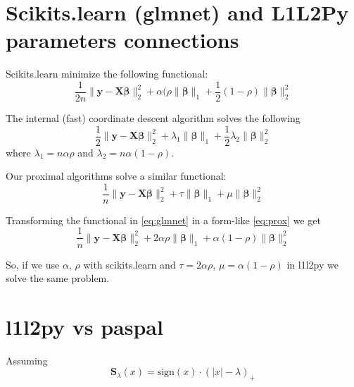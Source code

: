 \documentclass[a4paper,10pt]{article}
\title{}
\author{}
\newcommand{\bbeta}{\boldsymbol{\beta}}
\newcommand{\X}{\mathbf{X}}
\newcommand{\y}{\mathbf{y}}
\begin{document}
\maketitle

\begin{abstract}

\end{abstract}

\section{Scikits.learn (glmnet) and L1L2Py parameters connections}
Scikits.learn minimize the following functional:
\begin{equation} \label{eq:glmnet}
  \frac{1}{2n} \| \y - \X \bbeta \|_2^2 
      + \alpha( \rho \| \bbeta \|_1 + \frac{1}{2}(1 - \rho) \| \bbeta \|_2^2
\end{equation}

\noindent
The internal (fast) coordinate descent algorithm solves the following
\begin{equation}
  \frac{1}{2} \| \y - \X \bbeta \|_2^2 
      + \lambda_1 \| \bbeta \|_1 + \frac{1}{2}\lambda_2 \| \bbeta \|_2^2
\end{equation}
where $\lambda_1 = n\alpha\rho$ and $\lambda_2 = n\alpha(1 - \rho)$.

\noindent
Our proximal algorithms solve a similar functional:
\begin{equation} \label{eq:prox}
  \frac{1}{n} \| \y - \X \bbeta \|_2^2 
      + \tau \| \bbeta \|_1 + \mu \| \bbeta \|_2^2
\end{equation}

\noindent
Transforming the functional in \eqref{eq:glmnet} in a form-like
\eqref{eq:prox} we get
\begin{equation}
  \frac{1}{n} \| \y - \X \bbeta \|_2^2 
      + 2\alpha\rho \| \bbeta \|_1 + \alpha(1 - \rho) \| \bbeta \|_2^2
\end{equation}

\noindent
So, if we use $\alpha$, $\rho$ with scikits.learn and $\tau = 2\alpha\rho$,
$\mu = \alpha(1 - \rho)$ in l1l2py we solve the same problem.


\section{l1l2py vs paspal}

Assuming
\begin{equation}
  \mathbf{S}_{\lambda}(x) = \text{sign}(x) \cdot (|x| - \lambda)_{+}
\end{equation}
\end{document}
